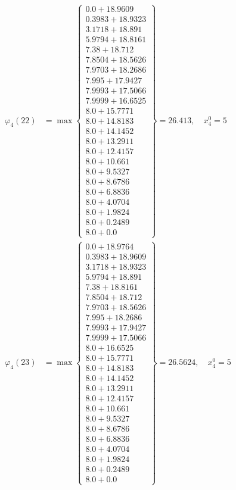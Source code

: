 \documentclass{article}
\begin{document}
\begin{align*}
\varphi_{4}(22) &= \max \left\{ \begin{array}{c}
0.0 + 18.9609 \\
 0.3983 + 18.9323 \\
 3.1718 + 18.891 \\
 5.9794 + 18.8161 \\
 7.38 + 18.712 \\
 7.8504 + 18.5626 \\
 7.9703 + 18.2686 \\
 7.995 + 17.9427 \\
 7.9993 + 17.5066 \\
 7.9999 + 16.6525 \\
 8.0 + 15.7771 \\
 8.0 + 14.8183 \\
 8.0 + 14.1452 \\
 8.0 + 13.2911 \\
 8.0 + 12.4157 \\
 8.0 + 10.661 \\
 8.0 + 9.5327 \\
 8.0 + 8.6786 \\
 8.0 + 6.8836 \\
 8.0 + 4.0704 \\
 8.0 + 1.9824 \\
 8.0 + 0.2489 \\
 8.0 + 0.0
\end{array} \right\}=26.413, \quad x_{4}^0=5\\
  
\varphi_{4}(23) &= \max \left\{ \begin{array}{c}
0.0 + 18.9764 \\
 0.3983 + 18.9609 \\
 3.1718 + 18.9323 \\
 5.9794 + 18.891 \\
 7.38 + 18.8161 \\
 7.8504 + 18.712 \\
 7.9703 + 18.5626 \\
 7.995 + 18.2686 \\
 7.9993 + 17.9427 \\
 7.9999 + 17.5066 \\
 8.0 + 16.6525 \\
 8.0 + 15.7771 \\
 8.0 + 14.8183 \\
 8.0 + 14.1452 \\
 8.0 + 13.2911 \\
 8.0 + 12.4157 \\
 8.0 + 10.661 \\
 8.0 + 9.5327 \\
 8.0 + 8.6786 \\
 8.0 + 6.8836 \\
 8.0 + 4.0704 \\
 8.0 + 1.9824 \\
 8.0 + 0.2489 \\
 8.0 + 0.0
\end{array} \right\}=26.5624, \quad x_{4}^0=5\\
  

\end{align*}
\end{document}
